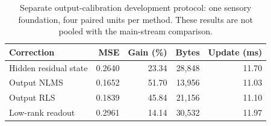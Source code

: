 \begin{table}[tbp]
\centering\small
\caption{Separate output-calibration development protocol: one sensory foundation, four paired units per method. These results are not pooled with the main-stream comparison.}
\label{tab:additional}
\begin{tabular}{@{}lrrrr@{}}
\toprule
Correction & MSE & Gain (\%) & Bytes & Update (ms) \\
\midrule
Hidden residual state & 0.2640 & 23.34 & 28,848 & 11.70 \\
Output NLMS & 0.1652 & 51.70 & 13,956 & 11.03 \\
Output RLS & 0.1839 & 45.84 & 21,156 & 11.10 \\
Low-rank readout & 0.2961 & 14.14 & 30,532 & 11.97 \\
\bottomrule
\end{tabular}
\end{table}
